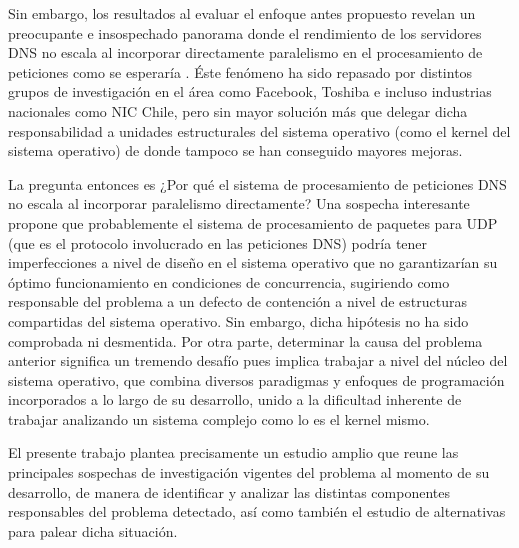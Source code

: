 \begin{intro}
Sin embargo, los resultados al evaluar el enfoque antes propuesto revelan un preocupante e insospechado panorama donde el rendimiento de los servidores DNS no escala al incorporar directamente paralelismo en el procesamiento de peticiones como se esperaría \cite{tesis:diegoDCC}. Éste fenómeno ha sido repasado por distintos grupos de investigación en el área como Facebook, Toshiba \cite{post:facebook, paper:toshiba} e incluso industrias nacionales como NIC Chile, pero sin mayor solución más que delegar dicha responsabilidad a unidades estructurales del sistema operativo (como el kernel del sistema operativo) de donde tampoco se han conseguido mayores mejoras.

La pregunta entonces es ¿Por qué el sistema de procesamiento de peticiones DNS no escala al incorporar paralelismo directamente? Una sospecha interesante propone que probablemente el sistema de procesamiento de paquetes para UDP (que es el protocolo involucrado en las peticiones DNS) podría tener imperfecciones a nivel de diseño en el sistema operativo que no garantizarían su óptimo funcionamiento en condiciones de concurrencia, sugiriendo como responsable del problema a un defecto de contención a nivel de estructuras compartidas del sistema operativo. Sin embargo, dicha hipótesis no ha sido comprobada ni desmentida. Por otra parte, determinar la causa del problema anterior significa un tremendo desafío pues implica trabajar a nivel del núcleo del sistema operativo, que combina diversos paradigmas y enfoques de programación incorporados a lo largo de su desarrollo, unido a la dificultad inherente de trabajar analizando un sistema complejo como lo es el kernel mismo.

El presente trabajo plantea precisamente un estudio amplio que reune las principales sospechas de investigación vigentes del problema al momento de su desarrollo, de manera de identificar y analizar las distintas componentes responsables del problema detectado, así como también el estudio de alternativas para palear dicha situación.


\end{intro}